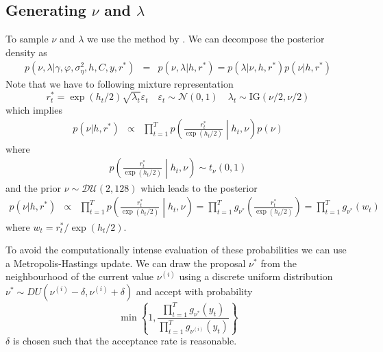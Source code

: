 \documentclass[12pt]{article}
\begin{document}
\subsection{Generating $\nu$ and $\lambda$  }
To sample $\nu$ and $\lambda$ we use the method by   \citet{JohannesStroud2014}. 
We can decompose the posterior density as
\begin{eqnarray}
p(\nu,\lambda | \gamma ,\varphi,\sigma^{2}_{\eta},h, C, y,r^{*})&=&p(\nu,\lambda |  h,  r^{*})=p( \lambda | \nu, h,  r^{*})p(\nu| h,  r^{*})
\end{eqnarray}
Note that we have to following mixture representation
\begin{equation}
r^{*}_t=\exp(h_t/2)\sqrt{\lambda_t}\varepsilon_t \quad \varepsilon_t \sim \mathcal{N}(0,1) \quad \lambda_t \sim \text{IG}(\nu/2,\nu/2)
\end{equation}
which implies
\begin{eqnarray}
p(\nu|h,r^{*})&\propto &\prod \limits_{t=1}^{T}  p\left(\frac{r^{*}_t}{\exp(h_t/2)} \middle| h_t,\nu \right)p(\nu)
\end{eqnarray}
where
\begin{eqnarray}
p\left(\frac{r^{*}_t}{\exp(h_t/2)} \middle| h_t,\nu \right) \sim t_{\nu}(0,1)
\end{eqnarray}
and the prior $\nu \sim \mathcal{DU}(2,128)$
which leads to the posterior
\begin{eqnarray}
p(\nu|h,r^{*})&\propto& \prod \limits_{t=1}^{T}  p\left(\frac{r^{*}_t}{\exp(h_t/2)} \middle| h_t,\nu \right)=\prod \limits_{t=1}^{T}  g_{\nu^{*}}\left(\frac{r^{*}_t}{\exp(h_t/2)}\right) =\prod \limits_{t=1}^{T}  g_{\nu^{*}}\left(w_t\right) 
\end{eqnarray}
where $w_t=r^{*}_t/\exp(h_t/2) $.

To avoid the computationally intense evaluation of these probabilities we can use a Metropolis-Hastings update. We can draw the proposal $\nu^{*}$ from the neighbourhood of the current value $\nu^{(i)}$ using a discrete uniform distribution $ \nu^{*} \sim DU(\nu^{(i)}-\delta ,\nu^{(i)}+\delta )$ and accept with probability
\begin{equation}
\min \left\{1, \frac{ \prod_{t=1}^{T} g_{\nu^{*}}(y_t) }{ \prod_{t=1}^{T}g_{\nu^{(i)}}(y_t) }  \right\}
\end{equation}
 $\delta$ is  chosen such that the acceptance rate is reasonable.
 
\end{document}
